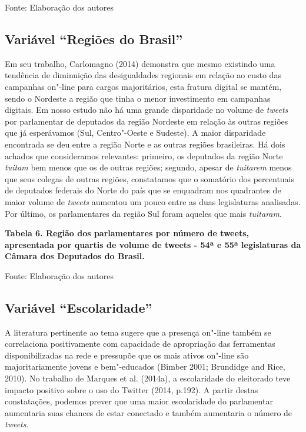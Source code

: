 Fonte: Elaboração dos autores

\subsection{Variável ``Regiões do Brasil'' }

Em seu trabalho, Carlomagno (2014) demonstra que mesmo existindo uma
tendência de diminuição das desigualdades regionais em relação ao custo
das campanhas on"-line para cargos majoritários, esta fratura digital se
mantém, sendo o Nordeste a região que tinha o menor investimento em
campanhas digitais. Em nosso estudo não há uma grande disparidade no
volume de \emph{tweets} por parlamentar de deputados da região Nordeste
em relação às outras regiões que já esperávamos (Sul, Centro"-Oeste e
Sudeste). A maior disparidade encontrada se deu entre a região Norte e
as outras regiões brasileiras. Há dois achados que consideramos
relevantes: primeiro, os deputados da região Norte \emph{tuitam} bem
menos que os de outras regiões; segundo, apesar de \emph{tuitarem} menos
que seus colegas de outras regiões, constatamos que o somatório dos
percentuais de deputados federais do Norte do país que se enquadram nos
quadrantes de maior volume de \emph{tweets} aumentou um pouco entre as
duas legislaturas analisadas. Por último, os parlamentares da região Sul
foram aqueles que mais \emph{tuitaram}.

\textbf{Tabela 6. Região dos parlamentares por número de tweets,
apresentada por quartis de volume de tweets - 54ª e 55ª legislaturas da
Câmara dos Deputados do Brasil.}

Fonte: Elaboração dos autores

\subsection{Variável ``Escolaridade''}

A literatura pertinente ao tema sugere que a presença on"-line também se
correlaciona positivamente com capacidade de apropriação das ferramentas
disponibilizadas na rede e pressupõe que os mais ativos on"-line são
majoritariamente jovens e bem"-educados (Bimber 2001; Brundidge and Rice,
2010). No trabalho de Marques et al. (2014a), a escolaridade do
eleitorado teve impacto positivo sobre o uso do Twitter (2014, p.192). A
partir destas constatações, podemos prever que uma maior escolaridade do
parlamentar aumentaria suas chances de estar conectado e também
aumentaria o número de \emph{tweets}.

